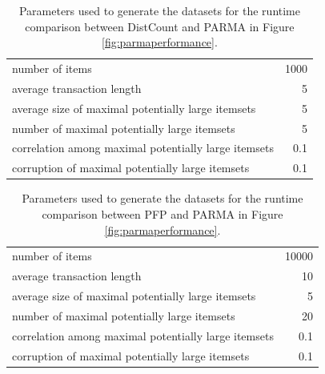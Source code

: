 \begin{table}[tb] \centering
\begin{tabular}{ l  r } \hline number of items & 1000 \\ 
average transaction length & 5 \\ 
average size of maximal potentially large itemsets & 5 \\ 
number of maximal potentially large itemsets & 5 \\
correlation among maximal potentially large itemsets & 0.1 \\
corruption of maximal potentially large itemsets & 0.1 \\ \hline
\end{tabular}
  \caption{Parameters used to generate the datasets for the runtime comparison between 
  DistCount and PARMA in Figure \ref{fig:parmaperformance}.}
  \label{tab:param1}
\end{table}

\begin{table}[tb] \centering
\begin{tabular}{ l  r } 
\hline 
number of items & 10000 \\ 
average transaction length & 10 \\ 
average size of maximal potentially large itemsets & 5 \\ 
number of maximal potentially large itemsets & 20 \\
correlation among maximal potentially large itemsets & 0.1 \\
corruption of maximal potentially large itemsets & 0.1 \\ 
\hline
\end{tabular}
  \caption{Parameters used to generate the datasets for the runtime comparison
  between PFP and PARMA in Figure \ref{fig:parmaperformance}.}
  \label{tab:param2}
\end{table}

